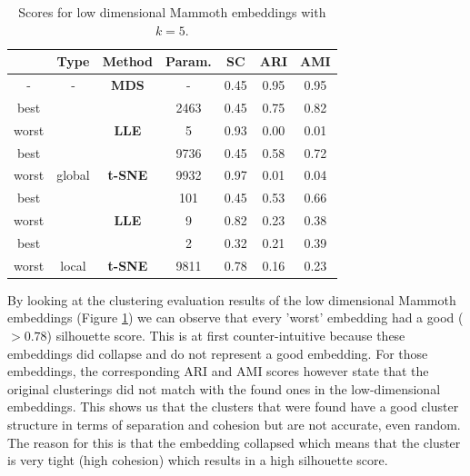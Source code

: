 \begin{table}[]
\centering
\begin{tabular}{|c|c|c|c|c|c|c|}
\hline
      & \textbf{Type}            & \textbf{Method}                                         & \textbf{Param.} & \textbf{SC} & \textbf{ARI} & \textbf{AMI} \\ \hline
-     & - & {\color[HTML]{1B9E77} \textbf{MDS}}                   & {\color[HTML]{1B9E77} -} & 0.45 & 0.95 & 0.95 \\ \hline
best  &   & {\color[HTML]{D95F02} }                               & 2463                     & 0.45 & 0.75 & 0.82 \\ \cline{1-1} \cline{4-7} 
worst &   & \multirow{-2}{*}{{\color[HTML]{D95F02} \textbf{LLE}}} & 5                        & 0.93 & 0.00 & 0.01 \\ \cline{1-1} \cline{3-7} 
best  &   & {\color[HTML]{7570B3} }                               & 9736                     & 0.45 & 0.58 & 0.72 \\ \cline{1-1} \cline{4-7} 
worst & \multirow{-4}{*}{global} & \multirow{-2}{*}{{\color[HTML]{7570B3} \textbf{t-SNE}}} & 9932            & 0.97        & 0.01         & 0.04         \\ \hline
best  &   & {\color[HTML]{D95F02} }                               & 101                      & 0.45 & 0.53 & 0.66 \\ \cline{1-1} \cline{4-7} 
worst &   & \multirow{-2}{*}{{\color[HTML]{D95F02} \textbf{LLE}}} & 9                        & 0.82 & 0.23 & 0.38 \\ \cline{1-1} \cline{3-7} 
best  &   & {\color[HTML]{7570B3} }                               & 2                        & 0.32 & 0.21 & 0.39 \\ \cline{1-1} \cline{4-7} 
worst & \multirow{-4}{*}{local}  & \multirow{-2}{*}{{\color[HTML]{7570B3} \textbf{t-SNE}}} & 9811            & 0.78        & 0.16         & 0.23         \\ \hline
\end{tabular}
\caption[Cluster Evaluation on 3D-Mammoth]{Scores for low dimensional Mammoth embeddings with $k=5$.}
\label{tab:clu_mammoth}
\end{table}

By looking at the clustering evaluation results of the low dimensional Mammoth embeddings (Figure \ref{tab:clu_mammoth}) we can observe that every 'worst' embedding had a good ($>0.78$) silhouette score. This is at first counter-intuitive because these embeddings did collapse and do not represent a good embedding. For those embeddings, the corresponding ARI and AMI scores however state that the original clusterings did not match with the found ones in the low-dimensional embeddings. This shows us that the clusters that were found have a good cluster structure in terms of separation and cohesion but are not accurate, even random. The reason for this is that the embedding collapsed which means that the cluster is very tight (high cohesion) which results in a high silhouette score.

